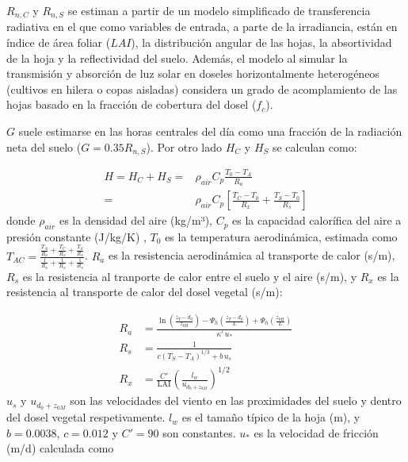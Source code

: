 \documentclass[a4paper,11pt]{article}
\begin{document}
  $R_{n,C}$ y $R_{n,S}$ se estiman a partir de un modelo simplificado de transferencia radiativa en el que como variables de entrada, a parte de la irradiancia, están en índice de área foliar ($LAI$), la distribución angular de las hojas, la absortividad de la hoja y la reflectividad del suelo. Además, el modelo al simular la transmisión y absorción de luz solar en doseles horizontalmente heterogéneos (cultivos en hilera o copas aisladas) considera un grado de acomplamiento de las hojas basado en la fracción de cobertura del dosel ($f_c$).
  
  $G$ suele estimarse en las horas centrales del día como una fracción de la radiación neta del suelo ($G = 0.35R_{n,S}$). Por otro lado $H_C$ y $H_S$ se calculan como:
  
  \begin{equation}\label{eq:H_partition}
   \begin{aligned}
    H=H_{C}+H_{S}=&\rho_{air} C_{p}\frac{T_{0}-T_{A}}{R_{a}}\\
    =&\rho_{air} C_{p}\left[\frac{T_{C}-T_{0}}{R_{x}}+\frac{T_{S}-T_{0}}{R_{s}}\right]
   \end{aligned}
  \end{equation}
  donde $\rho_{air}$ es la densidad del aire (kg/m³), $C_{p}$ es la capacidad calorífica del aire a presión constante  (J/kg/K) , $T_{0}$ es la temperatura aerodinámica, estimada como $T_{AC}=\frac{\frac{T_A}{R_a}+\frac{T_C}{R_x}+\frac{T_S}{R_s}}{\frac{1}{R_a} +\frac{1}{R_x}+\frac{1}{R_s}}$. $R_{a}$ es la resistencia aerodinámica al transporte de calor (s/m), $R_{s}$ es la resistencia al tranporte de calor entre el suelo y el aire (s/m), y $R_{x}$ es la resistencia al transporte de calor del dosel vegetal (s/m):

  \begin{subequations}
   \label{eq:resistances_series}
   \begin{align}
    R_{a}&=\frac{\ln\left(\frac{z_{T}-d_0}{z_{0H}}\right)-\Psi_{h}\left(\frac{z_{T}-d_0} {L}\right)+\Psi_{h}\left(\frac{z_{0H}}{L}\right)}{\kappa '\,u_{*}}\label{eq:ra}\\
    R_{s}&=\frac{1}{c\left(T_{S}-T_{A}\right)^{1/3}+b\,u_{s}}\label{eq:rs}\\ 
    R_{x}&=\frac{C'}{\mathrm{LAI}}\left(\frac{l_w}{u_{d_0+z_{0M}}}\right)^{1/2}\label{eq:rx}
   \end{align}
  \end{subequations}
  $u_s$ y $u_{d_0+z_{0M}}$ son las velocidades del viento en las proximidades del suelo y dentro del dosel vegetal respetivamente. $l_w$ es el tamaño típico de la hoja (m), y $b=0.0038$, $c=0.012$ y $C'=90$ son constantes. $u_{*}$ es la velocidad de fricción (m/d) calculada como
\end{document}
